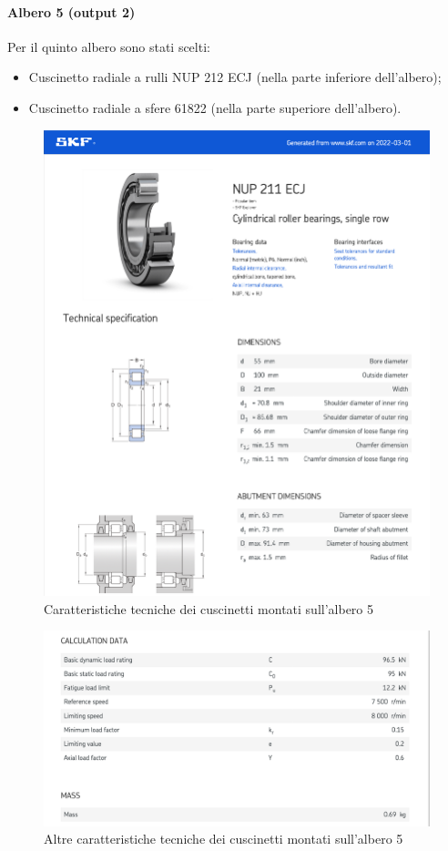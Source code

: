 \paragraph{Albero 5 (output 2)}
Per il quinto albero sono stati scelti:
\begin{itemize}
    \item Cuscinetto radiale a rulli NUP 212 ECJ (nella parte inferiore dell’albero);
    \item Cuscinetto radiale a sfere 61822 (nella parte superiore dell’albero).
\end{itemize}
\newpage
\begin{figure}[h]
    \centering
    \includegraphics[scale=0.6]{Immagini/Cuscinetti1Albero5.png}
    \caption{Caratteristiche tecniche dei cuscinetti montati sull'albero 5}
    \label{fig:Cuscinetti1Albero5}
\end{figure}
\newpage
\begin{figure}[h]
    \centering
    \includegraphics[scale=0.6]{Immagini/Cuscinetti2Albero5.png}
    \caption{Altre caratteristiche tecniche dei cuscinetti montati sull'albero 5}
    \label{fig:Cuscinetti2Albero5}
\end{figure}
